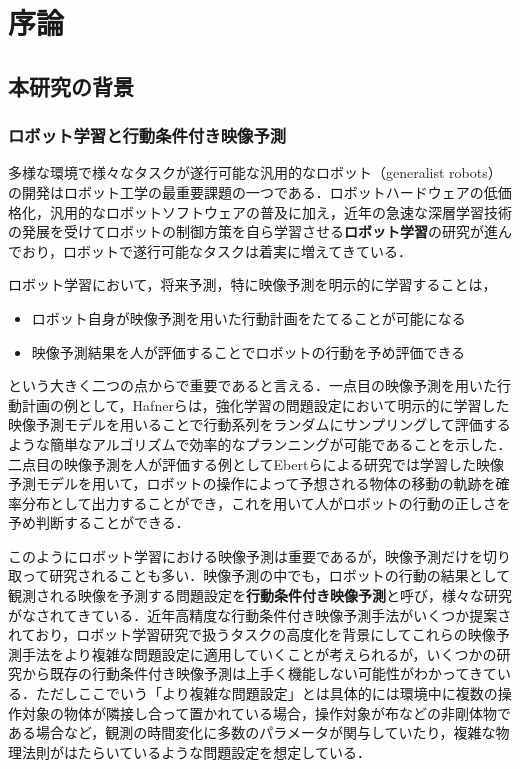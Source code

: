 \chapter{序論}
\label{chap:introduction}
\section{本研究の背景}
\subsection{ロボット学習と行動条件付き映像予測}
多様な環境で様々なタスクが遂行可能な汎用的なロボット（generalist robots）の開発はロボット工学の最重要課題の一つである\cite{escudero2015distance}．ロボットハードウェアの低価格化，汎用的なロボットソフトウェアの普及に加え，近年の急速な深層学習技術の発展を受けてロボットの制御方策を自ら学習させる{\bf ロボット学習}の研究が進んでおり，ロボットで遂行可能なタスクは着実に増えてきている．

ロボット学習において，将来予測，特に映像予測を明示的に学習することは，

\begin{itemize}
    \item ロボット自身が映像予測を用いた行動計画をたてることが可能になる
    \item 映像予測結果を人が評価することでロボットの行動を予め評価できる
\end{itemize}
という大きく二つの点からで重要であると言える．一点目の映像予測を用いた行動計画の例として，Hafnerら\cite{hafner2019planet}は，強化学習の問題設定において明示的に学習した映像予測モデルを用いることで行動系列をランダムにサンプリングして評価するような簡単なアルゴリズムで効率的なプランニングが可能であることを示した．二点目の映像予測を人が評価する例としてEbertらによる研究\cite{ebert2018visual}では学習した映像予測モデルを用いて，ロボットの操作によって予想される物体の移動の軌跡を確率分布として出力することができ，これを用いて人がロボットの行動の正しさを予め判断することができる．

このようにロボット学習における映像予測は重要であるが，映像予測だけを切り取って研究されることも多い．映像予測の中でも，ロボットの行動の結果として観測される映像を予測する問題設定を{\bf 行動条件付き映像予測}と呼び\cite{oh2015actionconditional}\cite{finn2016unsupervised}\cite{babaeizadeh2017stochastic}，様々な研究がなされてきている．近年高精度な行動条件付き映像予測手法がいくつか提案されており，ロボット学習研究で扱うタスクの高度化を背景にしてこれらの映像予測手法をより複雑な問題設定に適用していくことが考えられるが，いくつかの研究から既存の行動条件付き映像予測は上手く機能しない可能性がわかってきている．ただしここでいう「より複雑な問題設定」とは具体的には環境中に複数の操作対象の物体が隣接し合って置かれている場合，操作対象が布などの非剛体物である場合など，観測の時間変化に多数のパラメータが関与していたり，複雑な物理法則がはたらいているような問題設定を想定している．

